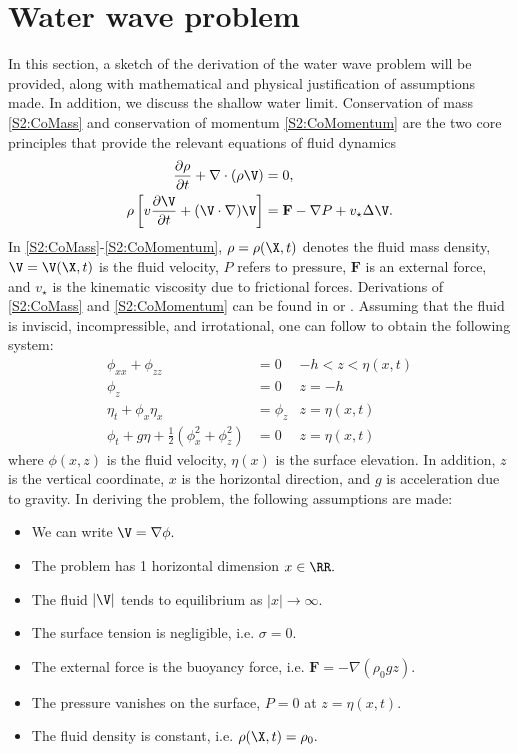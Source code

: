 \section{Water wave problem}
In this section, a sketch of the derivation of the water wave problem will be provided, along with mathematical and physical justification of assumptions made. In addition, we discuss the shallow water limit. Conservation of mass \eqref{S2:CoMass} and conservation of momentum \eqref{S2:CoMomentum} are the two core principles that provide the relevant equations of fluid dynamics
\begin{align}
\frac{\partial \rho}{\partial t} + \nabla \cdot (\rho \V) &= 0, \label{S2:CoMass} \\
\rho\left[ v\frac{\partial \V}{\partial t} + (\V \cdot \nabla) \V\right] &= \textbf{F} - \nabla P + v_{\star} \Delta \V. \label{S2:CoMomentum}
\end{align}
In \eqref{S2:CoMass}-\eqref{S2:CoMomentum}, $\rho = \rho(\X, t)$ denotes the fluid mass density, $\V = \V(\X,t)$ is the fluid velocity, $P$ refers to pressure, $\textbf{F}$ is an external force, and $v_{\star}$ is the kinematic viscosity due to frictional forces. Derivations of \eqref{S2:CoMass} and \eqref{S2:CoMomentum} can be found in \cite[Chapter 3]{Johnson} or \cite[Chapter 1]{CM}. Assuming that the fluid is inviscid, incompressible, and irrotational, one can follow \cite[Section 5.1]{Ablowitz} to obtain the following system:
\begin{subequations} \label{S2:DimWholeLineProblem}
\begin{align}
\phi_{xx} + \phi_{zz} &= 0 &-h < z < \eta(x,t) \label{S2:PDE}\\
\phi_{z} &= 0 &z = -h \label{S2:BBC}\\
\eta_t + \phi_{x}\eta_{x} &= \phi_{z} & z = \eta(x,t) \label{S2:KBC}\\
\phi_t + g\eta + \frac{1}{2}(\phi_{x}^2 + \phi_{z}^2) &= 0 &z = \eta(x,t) \label{S2:DBC}
\end{align}
\end{subequations}
where $\phi(x,z)$ is the fluid velocity, $\eta(x)$ is the surface elevation. In addition, $z$ is the vertical coordinate, $x$ is the horizontal direction, and $g$ is acceleration due to gravity. In deriving the problem, the following assumptions are made:
\begin{itemize}
\item We can write $\V = \nabla \phi.$
\item The problem has 1 horizontal dimension $x \in \RR.$
\item The fluid $|\V|$ tends to equilibrium as $|x| \to \infty.$
\item The surface tension is negligible, i.e. $\sigma = 0.$ 
\item The external force is the buoyancy force, i.e. $\textbf{F} = - \nabla (\rho_0 g z).$
\item The pressure vanishes on the surface, $P = 0$ at $z = \eta(x,t).$
\item The fluid density is constant, i.e. $\rho(\X,t) = \rho_0.$
\end{itemize}
